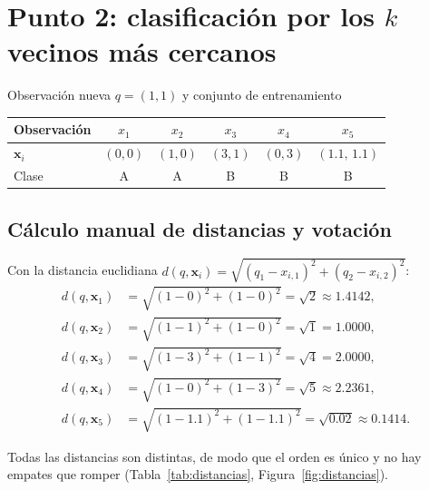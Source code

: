 \documentclass[11pt,a4paper]{article}
\newcommand{\x}{\mathbf{x}}
\begin{document}
\section{Punto 2: clasificación por los $k$ vecinos más cercanos}

Observación nueva $q = (1,1)$ y conjunto de entrenamiento

\begin{table}[H]
\centering
\begin{tabular}{lccccc}
\toprule
Observación & $x_1$ & $x_2$ & $x_3$ & $x_4$ & $x_5$\\
\midrule
$\x_i$ & $(0,0)$ & $(1,0)$ & $(3,1)$ & $(0,3)$ & $(1.1,\,1.1)$\\
Clase    & A & A & B & B & B\\
\bottomrule
\end{tabular}
\end{table}

\subsection{Cálculo manual de distancias y votación}

Con la distancia euclidiana
$d(q,\x_i) = \sqrt{(q_1 - x_{i,1})^2 + (q_2 - x_{i,2})^2}$:
\begin{align*}
d(q,\x_1) &= \sqrt{(1-0)^2 + (1-0)^2} = \sqrt{2} \approx 1.4142,\\
d(q,\x_2) &= \sqrt{(1-1)^2 + (1-0)^2} = \sqrt{1} = 1.0000,\\
d(q,\x_3) &= \sqrt{(1-3)^2 + (1-1)^2} = \sqrt{4} = 2.0000,\\
d(q,\x_4) &= \sqrt{(1-0)^2 + (1-3)^2} = \sqrt{5} \approx 2.2361,\\
d(q,\x_5) &= \sqrt{(1-1.1)^2 + (1-1.1)^2} = \sqrt{0.02} \approx 0.1414 .
\end{align*}

Todas las distancias son distintas, de modo que el orden es único y no hay
empates que romper (Tabla~\ref{tab:distancias}, Figura~\ref{fig:distancias}).
\end{document}
